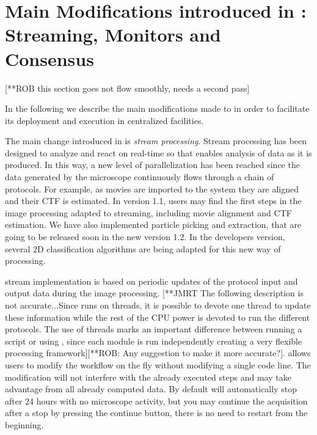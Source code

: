 \section{Main Modifications introduced in  \scipion: Streaming, Monitors and Consensus}
\label{overall}
[**ROB this section goes not flow smoothly, needs a second pass] 

In the following we describe the main modifications made to \scipion in order to facilitate its deployment and execution in centralized facilities. 

The main change introduced in \scipion is \emph{stream processing}. Stream processing has been designed to analyze and react on real-time so that enables analysis of data as it is produced.
In this way, a new level of parallelization has been reached since the  data generated by the microscope continuously flows through a chain of protocols. For example, as movies are imported to the system they are aligned and their CTF is estimated. In \scipion version 1.1, users may find  the first steps in the image processing adapted to streaming, including movie alignment and CTF estimation. We have also implemented particle picking and extraction, that are going to be released soon in the new version 1.2. In the developers version, several 2D classification algorithms are being adapted for this new way of processing.

\scipion stream implementation is based on periodic updates of the protocol input and output data during the image processing. 
[**JMRT The following description is not accurate...Since \scipion runs on threads, it is possible to devote one thread to update these information while the rest of the CPU power is devoted to run the different protocols. The use of threads marks an important difference between running a script or using \scipion, since  each module is run independently creating a very flexible processing framework][**ROB: Any suggestion to make it more accurate?]. \scipion allows users to modify the workflow on the fly without modifying a single code line. The modification will not interfere with the already executed steps and may take advantage from all already computed data. By default \scipion will automatically stop after 24 hours with no microscope activity, but you may  continue the acquisition after a stop by pressing the continue button, there is no need to restart from the beginning. 


